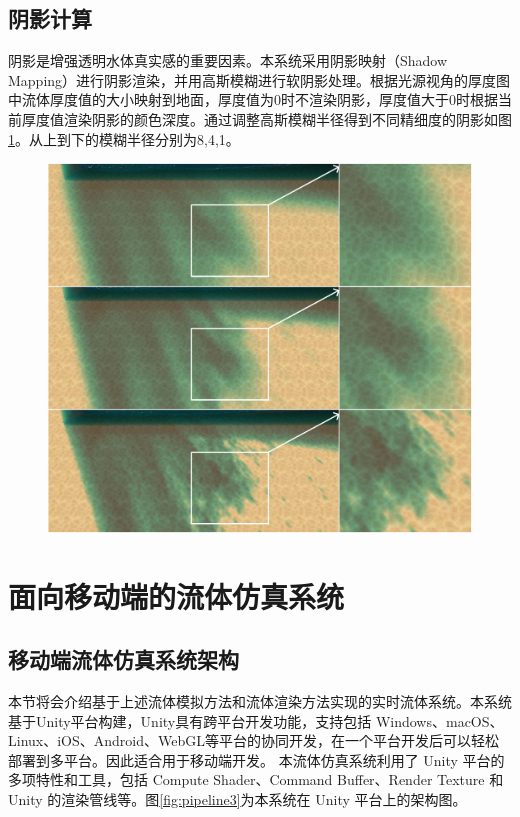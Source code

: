 \section{阴影计算}
阴影是增强透明水体真实感的重要因素。本系统采用阴影映射（Shadow Mapping）进行阴影渲染，并用高斯模糊进行软阴影处理。根据光源视角的厚度图中流体厚度值的大小映射到地面，厚度值为0时不渲染阴影，厚度值大于0时根据当前厚度值渲染阴影的颜色深度。通过调整高斯模糊半径得到不同精细度的阴影如图\ref{fig:compare3}。从上到下的模糊半径分别为8,4,1。
\begin{figure}[H]
    \centering
    \includegraphics[width=0.8\linewidth]{image/compare3.png}
    \label{fig:compare3}
\end{figure}








\chapter{面向移动端的流体仿真系统}

\section{移动端流体仿真系统架构}
本节将会介绍基于上述流体模拟方法和流体渲染方法实现的实时流体系统。本系统基于Unity平台构建，Unity具有跨平台开发功能，支持包括 Windows、macOS、Linux、iOS、Android、WebGL等平台的协同开发，在一个平台开发后可以轻松部署到多平台。因此适合用于移动端开发。
本流体仿真系统利用了 Unity 平台的多项特性和工具，包括 Compute Shader、Command Buffer、Render Texture 和 Unity 的渲染管线等。图\ref{fig:pipeline3}为本系统在 Unity 平台上的架构图。


